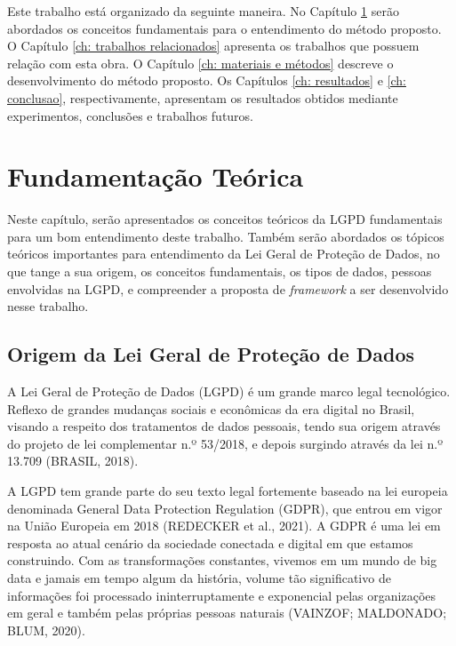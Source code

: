 \documentclass[
	12pt,				%
	openright,			%
	oneside,			%
	a4paper,			%
	english,			%
	french,				%
	spanish,			%
	brazil,				%
	]{abntex2}
\begin{document}
Este trabalho está organizado da seguinte maneira. No Capítulo \ref{ch: fundamentacao teorica} serão abordados os conceitos fundamentais para o entendimento do método proposto. O Capítulo \ref{ch: trabalhos relacionados} apresenta os trabalhos que possuem relação com esta obra. O Capítulo \ref{ch: materiais e métodos} descreve o desenvolvimento do método proposto. Os Capítulos \ref{ch: resultados} e \ref{ch: conclusao}, respectivamente, apresentam os resultados obtidos mediante experimentos, conclusões e trabalhos futuros.


\setcounter{chapter}{1}
\chapter{Fundamentação Teórica}
\label{ch: fundamentacao teorica}

Neste capítulo, serão apresentados os conceitos teóricos da LGPD fundamentais para um bom entendimento deste trabalho. Também serão abordados os tópicos teóricos importantes para entendimento da Lei Geral de Proteção de Dados, no que tange a sua origem, os conceitos fundamentais, os tipos de dados, pessoas envolvidas na LGPD, e compreender a proposta de \textit{framework} a ser desenvolvido nesse trabalho.

\section{Origem da Lei Geral de Proteção de Dados }
\label{sec: exemplo}

A Lei Geral de Proteção de Dados (LGPD) é um grande marco legal tecnológico. Reflexo de grandes mudanças sociais e econômicas da era digital no Brasil, visando a respeito dos tratamentos de dados pessoais, tendo sua origem através do projeto de lei complementar n.º 53/2018, e depois surgindo através da lei n.º 13.709 (BRASIL, 2018). 

A LGPD tem grande parte do seu texto legal fortemente baseado na lei europeia denominada General Data Protection Regulation (GDPR), que entrou em vigor na União Europeia em 2018 (REDECKER et al., 2021). A GDPR é uma lei em resposta ao atual cenário da sociedade conectada e digital em que estamos construindo. Com as transformações constantes, vivemos em um mundo de big data e jamais em tempo algum da história, volume tão significativo de informações foi processado ininterruptamente e exponencial pelas organizações em geral e também pelas próprias pessoas naturais (VAINZOF; MALDONADO; BLUM, 2020).
\end{document}
